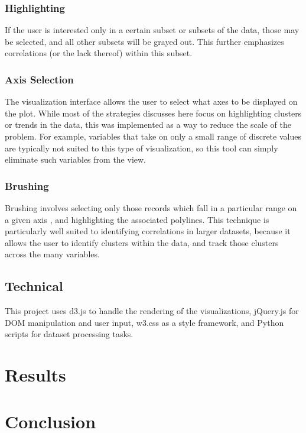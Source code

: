 \documentclass[]{article}
\begin{document}
		\subsubsection{Highlighting}
			If the user is interested only in a certain subset or subsets of the data, those may be selected, and all other subsets will be grayed out. This further emphasizes correlations (or the lack thereof) within this subset.
		\subsubsection{Axis Selection}
			The visualization interface allows the user to select what axes to be displayed on the plot. While most of the strategies discusses here focus on highlighting clusters or trends in the data, this was implemented as a way to reduce the scale of the problem. For example, variables that take on only a small range of discrete values are typically not suited to this type of visualization\cite{kosara}, so this tool can simply eliminate such variables from the view.
		\subsubsection{Brushing}
			Brushing involves selecting only those records which fall in a particular range on a given axis \cite{bostock,kosara}, and highlighting the associated polylines. This technique is particularly well suited to identifying correlations in larger datasets, because it allows the user to identify clusters within the data, and track those clusters across the many variables.
	\subsection{Technical}
		This project uses d3.js to handle the rendering of the visualizations, jQuery.js for DOM manipulation and user input, w3.css as a style framework, and Python scripts for dataset processing tasks.
\section{Results}

\section{Conclusion}
\end{document}
